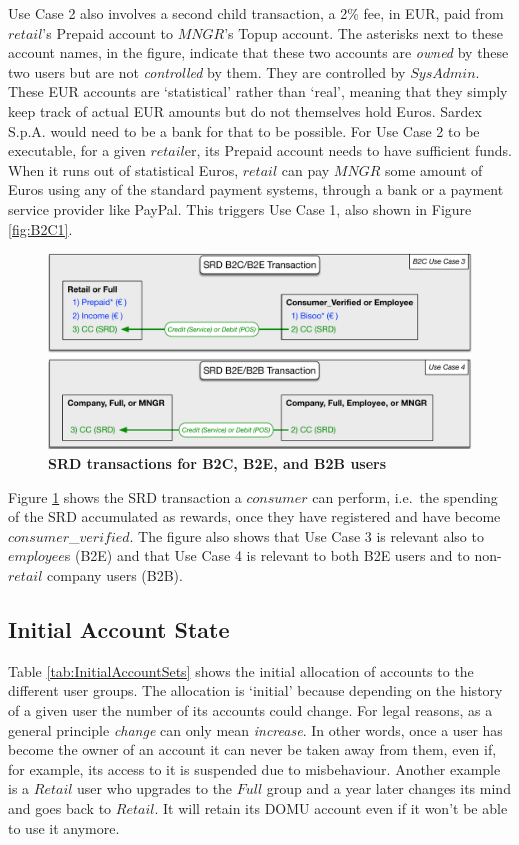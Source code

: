 Use Case 2 also involves a second child transaction, a 2\% fee, in EUR, paid from $retail$'s Prepaid account to $MNGR$'s Topup account. The asterisks next to these account names, in the figure, indicate that these two accounts are \emph{owned} by these two users but are not \emph{controlled} by them. They are controlled by $SysAdmin$. These EUR accounts are `statistical' rather than `real', meaning that they simply keep track of actual EUR amounts but do not themselves hold Euros. Sardex S.p.A. would need to be a bank for that to be possible. For Use Case 2 to be executable, for a given $retail$er, its Prepaid account needs to have sufficient funds. When it runs out of statistical Euros, $retail$ can pay $MNGR$ some amount of Euros using any of the standard payment systems, through a bank or a payment service provider like PayPal. This triggers Use Case 1, also shown in Figure \ref{fig:B2C1}.

\begin{figure}[h]
\centering
\includegraphics[width=15cm]{Figures/B2C2}
\caption{\small\textbf{SRD transactions for B2C, B2E, and B2B users}}
\label{fig:B2C2}
\end{figure}

Figure \ref{fig:B2C2} shows the SRD transaction a $consumer$ can perform, i.e.\ the spending of the SRD accumulated as rewards, once they have registered and have become $consumer$\_$verified$. The figure also shows that Use Case 3 is relevant also to $employee$s (B2E) and that Use Case 4 is relevant to both B2E users and to non-$retail$ company users (B2B).

\subsection{Initial Account State}
Table \ref{tab:InitialAccountSets} shows the initial allocation of accounts to the different user groups. The allocation is `initial' because  depending on the history of a given user the number of its accounts could change. For legal reasons, as a general principle \emph{change} can only mean \emph{increase}. In other words, once a user has become the owner of an account it can never be taken away from them, even if, for example, its access to it is suspended due to misbehaviour. Another example is a $Retail$ user who upgrades to the $Full$ group and a year later changes its mind and goes back to $Retail$. It will retain its DOMU account even if it won't be able to use it anymore.

